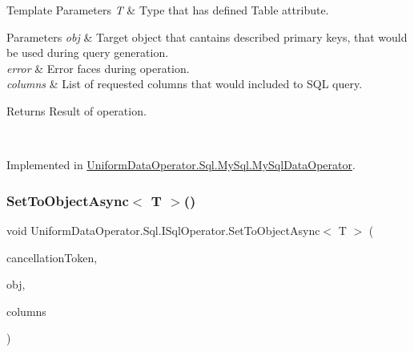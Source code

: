 \begin{DoxyTemplParams}{Template Parameters}
{\em T} & Type that has defined Table attribute. 
\begin{DoxyParams}{Parameters}
{\em obj} & Target object that cantains described primary keys, that would be used during query generation.\\
\hline
{\em error} & Error faces during operation.\\
\hline
{\em columns} & List of requested columns that would included to S\+QL query.\\
\hline
\end{DoxyParams}
\begin{DoxyReturn}{Returns}
Result of operation.
\end{DoxyReturn}
\\
\hline
\end{DoxyTemplParams}


Implemented in \mbox{\hyperlink{class_uniform_data_operator_1_1_sql_1_1_my_sql_1_1_my_sql_data_operator_add7cba0bf95fbe58e589b770eee695ee}{Uniform\+Data\+Operator.\+Sql.\+My\+Sql.\+My\+Sql\+Data\+Operator}}.

\mbox{\label{interface_uniform_data_operator_1_1_sql_1_1_i_sql_operator_ab2ab621174a956a67f9799469570dd11}} 
\subsubsection{\texorpdfstring{Set\+To\+Object\+Async$<$ T $>$()}{SetToObjectAsync< T >()}}
{\footnotesize\ttfamily void Uniform\+Data\+Operator.\+Sql.\+I\+Sql\+Operator.\+Set\+To\+Object\+Async$<$ T $>$ (\begin{DoxyParamCaption}\item[{Cancellation\+Token}]{cancellation\+Token,  }\item[{object}]{obj,  }\item[{params string \mbox{[}$\,$\mbox{]}}]{columns }\end{DoxyParamCaption})}



